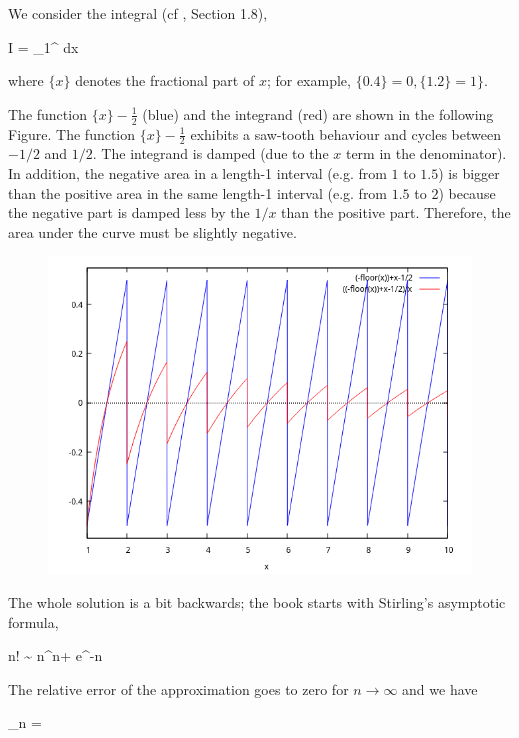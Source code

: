 
We consider the integral (cf \cite{nahin2020inside}, Section 1.8),

\bee
I = \int_1^\infty {} dx
\eee

where $\{x\}$ denotes the fractional part of $x$; for example, $\{0.4\} = 0, \{1.2\} = 1\}$.

The function $\{x\} - \frac{1}{2}$ (blue) and the integrand (red) are shown in the following Figure. The function $\{x\} - \frac{1}{2}$ exhibits a saw-tooth behaviour and cycles between $-1/2$ and $1/2$. The integrand is damped (due to the $x$ term in the denominator). In addition, the negative area in a length-1 interval (e.g. from $1$ to $1.5$) is bigger than the positive area in the same length-1 interval (e.g. from $1.5$ to $2$) because the negative part is damped less by the $1/x$ than the positive part. Therefore, the area under the curve must be slightly negative.

\begin{figure}[H]
\includegraphics[scale=0.7]{images/2022-03-15_plot_1.png}
\end{figure}

The whole solution is a bit backwards; the book starts with Stirling's asymptotic formula,

\bee
n! \sim \sqrt{2\pi} n^{n+} e^{-n}
\eee

The relative error of the approximation goes to zero for $n \rightarrow \infty$ and we have

\bee
\lim_{n \rightarrow \infty}  = \sqrt{2\pi}
\eee

